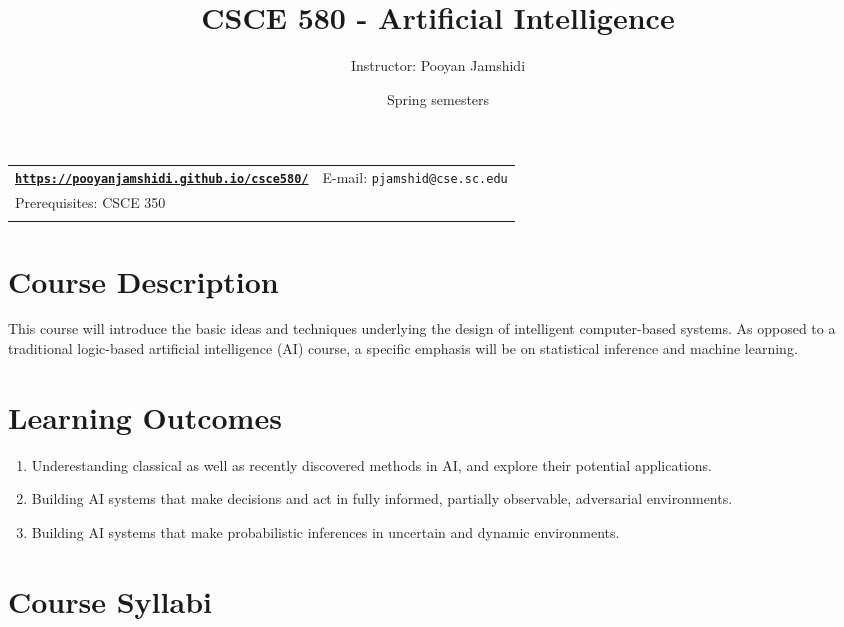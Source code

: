 \documentclass[11pt]{article}
\title{CSCE 580 - Artificial Intelligence}
\author{Instructor: Pooyan Jamshidi}
\date{Spring semesters}
\newcommand{\blankline}{\quad\pagebreak[2]}
\begin{document}
\maketitle

\blankline

\begin{tabular*}{.93\textwidth}{@{\extracolsep{\fill}}lr}


\href{https://pooyanjamshidi.github.io/csce580/}{\tt\bf https://pooyanjamshidi.github.io/csce580/}  & E-mail: \texttt{pjamshid@cse.sc.edu} \\
Prerequisites: CSCE 350 \\

&  \\

\hline
\end{tabular*}

\vspace{10mm}

\section*{Course Description}

This course will introduce the basic ideas and techniques underlying the design of intelligent computer-based systems. As opposed to a traditional logic-based artificial intelligence (AI) course, a specific emphasis will be on statistical inference and machine learning. 



\section*{Learning Outcomes}
\begin{enumerate}
\item Underestanding classical as well as recently discovered methods in AI, and explore their potential applications.

\item Building AI systems that make decisions and act in fully informed, partially observable, adversarial environments.

\item Building AI systems that make probabilistic inferences in uncertain and dynamic environments.

\end{enumerate}


\section*{Course Syllabi}
\end{document}
